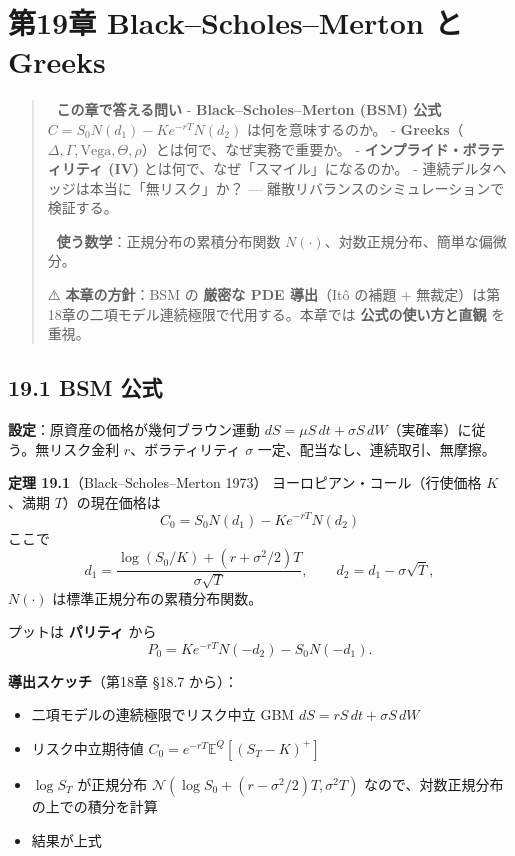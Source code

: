 \documentclass[11pt,a4paper]{report}
\begin{document}
\noindent\hrulefill

\chapter{第19章 Black–Scholes–Merton と Greeks}

\begin{quote}
🎯 \textbf{この章で答える問い}
- \textbf{Black–Scholes–Merton (BSM) 公式} $C = S_0 N(d_1) - K e^{-rT} N(d_2)$ は何を意味するのか。
- \textbf{Greeks}（$\Delta, \Gamma, \mathrm{Vega}, \Theta, \rho$）とは何で、なぜ実務で重要か。
- \textbf{インプライド・ボラティリティ (IV)} とは何で、なぜ「スマイル」になるのか。
- 連続デルタヘッジは本当に「無リスク」か？ — 離散リバランスのシミュレーションで検証する。

📐 \textbf{使う数学}：正規分布の累積分布関数 $N(\cdot)$、対数正規分布、簡単な偏微分。

⚠️ \textbf{本章の方針}：BSM の \textbf{厳密な PDE 導出}（Itô の補題 + 無裁定）は第18章の二項モデル連続極限で代用する。本章では \textbf{公式の使い方と直観} を重視。
\end{quote}

\section{19.1 BSM 公式}

\textbf{設定}：原資産の価格が幾何ブラウン運動 $dS = \mu S\, dt + \sigma S\, dW$（実確率）に従う。無リスク金利 $r$、ボラティリティ $\sigma$ 一定、配当なし、連続取引、無摩擦。

\textbf{定理 19.1}（Black–Scholes–Merton 1973） ヨーロピアン・コール（行使価格 $K$、満期 $T$）の現在価格は \[ \boxed{\; C_0 = S_0 N(d_1) - K e^{-rT} N(d_2) \;} \] ここで \[ d_1 = \frac{\log(S_0 / K) + (r + \sigma^2 / 2) T}{\sigma \sqrt{T}}, \qquad d_2 = d_1 - \sigma \sqrt{T}, \] $N(\cdot)$ は標準正規分布の累積分布関数。

プットは \textbf{パリティ} から \[ P_0 = K e^{-rT} N(-d_2) - S_0 N(-d_1). \]

\textbf{導出スケッチ}（第18章 §18.7 から）：
\begin{itemize}
\item 二項モデルの連続極限でリスク中立 GBM $dS = r S\, dt + \sigma S\, dW$
\item リスク中立期待値 $C_0 = e^{-rT} \mathbb{E}^Q[(S_T - K)^+]$
\item $\log S_T$ が正規分布 $\mathcal{N}(\log S_0 + (r - \sigma^2/2)T, \sigma^2 T)$ なので、対数正規分布の上での積分を計算
\item 結果が上式
\end{itemize}
\end{document}
